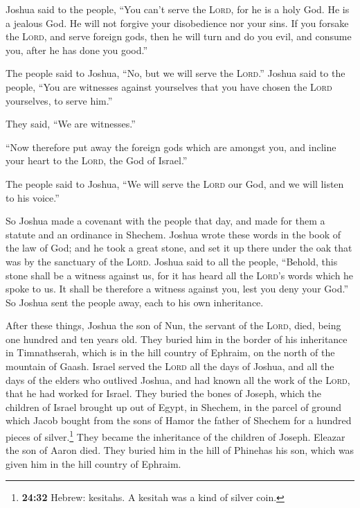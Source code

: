  Joshua said to the people, ``You can't serve the
\textsc{Lord}, for he is a holy God. He is a jealous God. He will not
forgive your disobedience nor your sins.  If you forsake
the \textsc{Lord}, and serve foreign gods, then he will turn and do you
evil, and consume you, after he has done you good.''

 The people said to Joshua, ``No, but we will serve the
\textsc{Lord}.''  Joshua said to the people, ``You are
witnesses against yourselves that you have chosen the \textsc{Lord}
yourselves, to serve him.''

They said, ``We are witnesses.''

 ``Now therefore put away the foreign gods which are
amongst you, and incline your heart to the \textsc{Lord}, the God of
Israel.''

 The people said to Joshua, ``We will serve the
\textsc{Lord} our God, and we will listen to his voice.''

 So Joshua made a covenant with the people that day, and
made for them a statute and an ordinance in Shechem. 
Joshua wrote these words in the book of the law of God; and he took a
great stone, and set it up there under the oak that was by the sanctuary
of the \textsc{Lord}.  Joshua said to all the people,
``Behold, this stone shall be a witness against us, for it has heard all
the \textsc{Lord}'s words which he spoke to us. It shall be therefore a
witness against you, lest you deny your God.''  So Joshua
sent the people away, each to his own inheritance.

 After these things, Joshua the son of Nun, the servant
of the \textsc{Lord}, died, being one hundred and ten years old.
 They buried him in the border of his inheritance in
Timnathserah, which is in the hill country of Ephraim, on the north of
the mountain of Gaash.  Israel served the \textsc{Lord}
all the days of Joshua, and all the days of the elders who outlived
Joshua, and had known all the work of the \textsc{Lord}, that he had
worked for Israel.  They buried the bones of Joseph,
which the children of Israel brought up out of Egypt, in Shechem, in the
parcel of ground which Jacob bought from the sons of Hamor the father of
Shechem for a hundred pieces of silver.\footnote{\textbf{24:32} Hebrew:
  kesitahs. A kesitah was a kind of silver coin.} They became the
inheritance of the children of Joseph.  Eleazar the son
of Aaron died. They buried him in the hill of Phinehas his son, which
was given him in the hill country of Ephraim.
